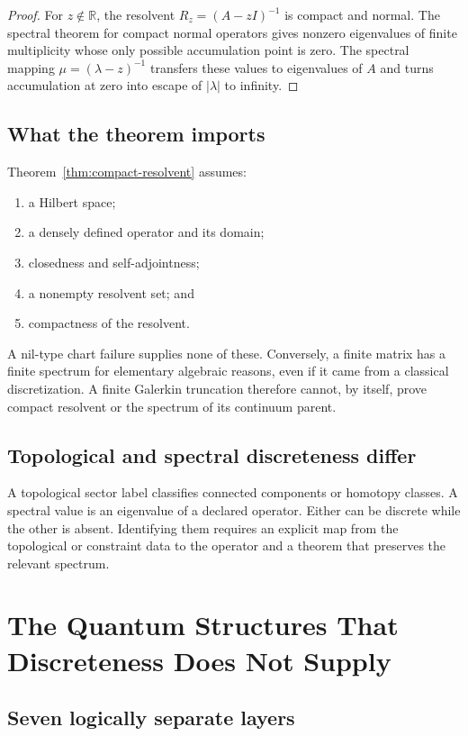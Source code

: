 \documentclass[11pt]{article}
\begin{document}
\begin{proof}
For $z\notin\mathbb R$, the resolvent
$R_z=(A-zI)^{-1}$ is compact and normal.  The spectral theorem for compact
normal operators gives nonzero eigenvalues of finite multiplicity whose only
possible accumulation point is zero.  The spectral mapping
$\mu=(\lambda-z)^{-1}$ transfers these values to eigenvalues of $A$ and turns
accumulation at zero into escape of $|\lambda|$ to infinity.
\end{proof}

\subsection{What the theorem imports}

Theorem~\ref{thm:compact-resolvent} assumes:
\begin{enumerate}
\item a Hilbert space;
\item a densely defined operator and its domain;
\item closedness and self-adjointness;
\item a nonempty resolvent set; and
\item compactness of the resolvent.
\end{enumerate}
A nil-type chart failure supplies none of these.  Conversely, a finite matrix
has a finite spectrum for elementary algebraic reasons, even if it came from a
classical discretization.  A finite Galerkin truncation therefore cannot, by
itself, prove compact resolvent or the spectrum of its continuum parent.

\subsection{Topological and spectral discreteness differ}

A topological sector label classifies connected components or homotopy classes.
A spectral value is an eigenvalue of a declared operator.  Either can be
discrete while the other is absent.  Identifying them requires an explicit map
from the topological or constraint data to the operator and a theorem that
preserves the relevant spectrum.

\section{The Quantum Structures That Discreteness Does Not Supply}

\subsection{Seven logically separate layers}
\end{document}

